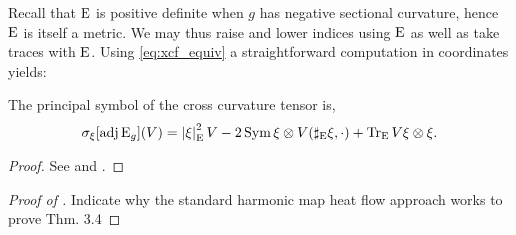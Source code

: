\documentclass[a4paper,12pt]{amsart}
\begin{document}
Recall that \(\operatorname{E}\) is positive definite when \(g\) has negative sectional curvature, hence \(\operatorname{E}\) is itself a metric. We may thus raise and lower indices using \(\operatorname{E}\) as well as take traces with \(\operatorname{E}\). Using \eqref{eq:xcf_equiv} a straightforward computation in coordinates yields:

\begin{lemma}
\label{lem:xcf_symbol}
The principal symbol of the cross curvature tensor is,
\[
\sigma_{\xi} [\operatorname{adj}\operatorname{E}_g] (V) = \left\lvert{\xi}\right\rvert^2_{\operatorname{E}}V - 2 \operatorname{Sym} \xi \otimes V(\sharp_{\operatorname{E}}\xi, \cdot) + \operatorname{Tr}_{\operatorname{E}} V \xi \otimes \xi.
\]
\end{lemma}
\begin{proof}
See \cite[Lemma 4]{MR2055396} and \cite[Theorem 1]{MR2207496}.
\end{proof}

%

\begin{proof}[Proof of ]
{\color{red} Indicate why the standard harmonic map heat flow approach works to prove Thm. 3.4}
\end{proof}
\end{document}
